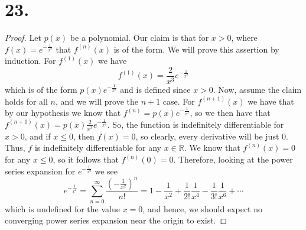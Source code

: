 \documentclass{article}
\begin{document}
\section*{23.}
\begin{proof}
    Let $p(x)$ be a polynomial. Our claim is that for $x > 0$, where $f(x) = e^{-\frac{1}{x^2}}$ that $f^{(n)}(x)$ is of the form. 
    We will prove this assertion by induction. For $f^{(1)}(x)$ we have 
    \[f^{(1)}(x) = \frac{2}{x^3}e^{-\frac{1}{x^2}}\] 
    which is of the form $p(x)e^{-\frac{1}{x^2}}$ and is defined since $x > 0$. Now, assume the claim holds for all $n$, and we will prove the $n + 1$ case. For $f^{(n + 1)}(x)$ we have that by our hypothesis we know that $f^{(n)} = p(x)e^{-\frac{1}{x^2}}$, so we then have that $f^{(n + 1)}(x) = p(x) \frac{2}{x^3}e^{-\frac{1}{x^2}}$. So, the function is indefinitely differentiable
    for $x > 0$, and if $x\leq 0$, then $f(x) = 0 $, so clearly, every derivative will be just $0$. Thus, $f$ is indefinitely differentiable for any $x \in \mathbb{R}$. We know that $f^{(n)}(x) = 0$ for any $x \leq 0$, so it follows that $f^{(n)}(0) = 0$. 
    Therefore, looking at the power series expansion for $e^{-\frac{1}{x^2}}$ we see 
    \[
    e^{-\frac{1}{x^2}} = \sum\limits_{n = 0}^{\infty}\frac{\left(-\frac{1}{x^2} \right)^n}{n!} = 1 - \frac{1}{x^2} + \frac{1}{2!}\frac{1}{x^4} - \frac{1}{3!}\frac{1}{x^6} + \cdots    
    \] 
    which is undefined for the value $x = 0$, and hence, we should expect no converging power series expansion near the origin to exist. 
\end{proof}
                            
\end{document}
